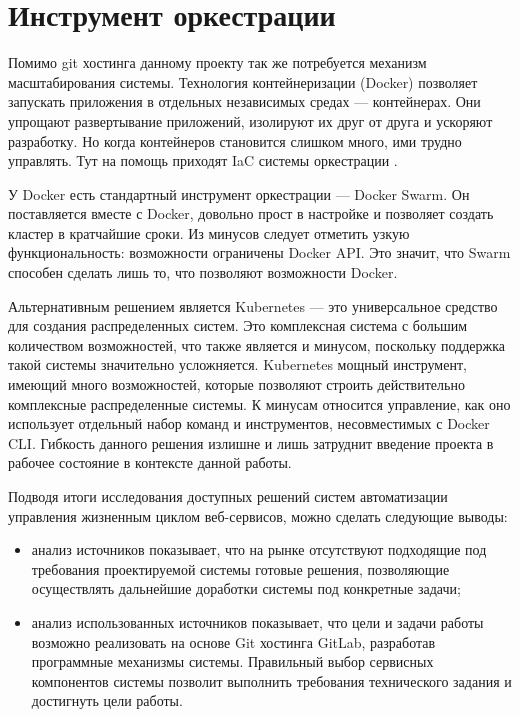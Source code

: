 \section{Инструмент оркестрации}

Помимо git хостинга данному проекту так же потребуется механизм масштабирования системы.
Технология контейнеризации (Docker) позволяет запускать приложения в отдельных независимых средах --- контейнерах.
Они упрощают развертывание приложений, изолируют их друг от друга и ускоряют разработку.
Но когда контейнеров становится слишком много, ими трудно управлять.
Тут на помощь приходят IaC системы оркестрации \cite{likeGoogle}.

У Docker есть стандартный инструмент оркестрации --- Docker Swarm.
Он поставляется вместе с Docker, довольно прост в настройке и позволяет создать кластер в кратчайшие сроки.
Из минусов следует отметить узкую функциональность: возможности ограничены Docker API.
Это значит, что Swarm способен сделать лишь то, что позволяют возможности Docker\cite{fasterDevOps}.

Альтернативным решением является Kubernetes --- это универсальное средство для создания распределенных систем.
Это комплексная система с большим количеством возможностей, что также является и минусом, поскольку поддержка такой системы значительно усложняется.
Kubernetes мощный инструмент, имеющий много возможностей, которые позволяют строить действительно комплексные распределенные системы.
К минусам относится управление, как оно использует отдельный набор команд и инструментов, несовместимых с Docker CLI\cite{web:docker-kubernetes}.
Гибкость данного решения излишне и лишь затруднит введение проекта в рабочее состояние в контексте данной работы.

Подводя итоги исследования доступных решений систем автоматизации управления жизненным циклом веб-сервисов, можно сделать следующие выводы:
\begin{itemize}
    \item анализ источников показывает, что на рынке отсутствуют подходящие под требования проектируемой системы готовые решения,
    позволяющие осуществлять дальнейшие доработки системы под конкретные задачи;
    \item анализ использованных источников показывает, что цели и задачи работы возможно реализовать на основе Git хостинга GitLab,
    разработав программные механизмы системы.
    Правильный выбор сервисных компонентов системы позволит выполнить требования технического задания и достигнуть цели работы.
\end{itemize}

